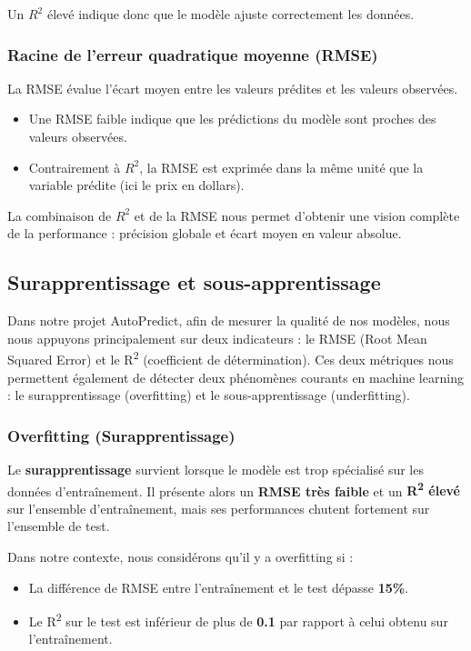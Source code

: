 \documentclass[12pt]{report}
\begin{document}
Un \( R^2 \) élevé indique donc que le modèle ajuste correctement les données.

\subsubsection*{Racine de l'erreur quadratique moyenne (RMSE)}

La RMSE évalue l'écart moyen entre les valeurs prédites et les valeurs observées. 
\begin{itemize}
    \item Une RMSE faible indique que les prédictions du modèle sont proches des valeurs observées.
    \item Contrairement à \( R^2 \), la RMSE est exprimée dans la même unité que la variable prédite (ici le prix en dollars).
\end{itemize}

La combinaison de \( R^2 \) et de la RMSE nous permet d’obtenir une vision complète de la performance : précision globale et écart moyen en valeur absolue.

\subsection{Surapprentissage et sous-apprentissage}

Dans notre projet AutoPredict, afin de mesurer la qualité de nos modèles, nous nous appuyons principalement sur deux indicateurs : le RMSE (Root Mean Squared Error) et le R\textsuperscript{2} (coefficient de détermination). Ces deux métriques nous permettent également de détecter deux phénomènes courants en machine learning : le surapprentissage (overfitting) et le sous-apprentissage (underfitting).

\subsubsection{Overfitting (Surapprentissage)}

Le \textbf{surapprentissage} survient lorsque le modèle est trop spécialisé sur les données d'entraînement. Il présente alors un \textbf{RMSE très faible} et un \textbf{R\textsuperscript{2} élevé} sur l'ensemble d'entraînement, mais ses performances chutent fortement sur l'ensemble de test. 

Dans notre contexte, nous considérons qu'il y a overfitting si :
\begin{itemize}
    \item La différence de RMSE entre l'entraînement et le test dépasse \textbf{15\%}.
    \item Le R\textsuperscript{2} sur le test est inférieur de plus de \textbf{0.1} par rapport à celui obtenu sur l'entraînement.
\end{itemize}
\end{document}
